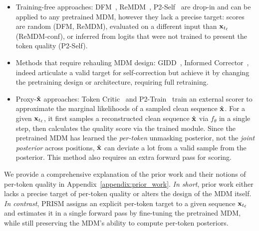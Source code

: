 \begin{itemize}[leftmargin=10pt, noitemsep, parsep=3pt, topsep=0pt]
    \item Training-free approaches: DFM~\citep{gat2024discrete}, ReMDM~\citep{wang2025remasking}, P2-Self~\citep{peng2025pathplanningmaskeddiffusion} are drop-in and can be applied to any pretrained MDM, however they lack a precise target: scores are random (DFM, ReMDM), evaluated on a different input than ${\mathbf{x}}_{t_\ell}$ (ReMDM-conf), or inferred from logits that were not trained to present the token quality (P2-Self).
    \item Methods that require rehauling MDM design:  GIDD~\citep{von2025generalized}, Informed Corrector~\citep{zhao2024informed}, indeed articulate a valid target for self-correction but achieve it by changing the pretraining design or architecture, requiring full retraining. 
    \item Proxy-$\hat{{\mathbf{x}}}$ approaches: Token Critic~\citep{gou2023critic} and P2-Train~\citep{peng2025pathplanningmaskeddiffusion} train an external scorer to approximate the marginal likelihoods of a sampled clean sequence $\hat{{\mathbf{x}}}$. For a given ${\mathbf{x}}_{t_\ell}$, it first samples a reconstructed clean sequence $\hat{{\mathbf{x}}}$ via $f_\theta$ in a single step, then calculates the quality score via the trained module. Since the pretrained MDM has learned the \emph{per-token} unmasking posterior, not the \emph{joint posterior} across positions, $\hat{{\mathbf{x}}}$ can deviate a lot from a valid sample from the posterior. This method also requires an extra forward pass for scoring.
\end{itemize}
We provide a comprehensive explanation of the prior work and their notions of per-token quality in Appendix~\ref{appendix:prior_work}. \emph{In short}, prior work either lacks a precise target of per-token quality or alters the design of the MDM itself. \emph{In contrast}, PRISM assigns an explicit per-token target to a given sequence ${\mathbf{x}}_{t_\ell}$ and estimates it in a single forward pass by fine-tuning the pretrained MDM, while still preserving the MDM’s ability to compute per-token posteriors. 
